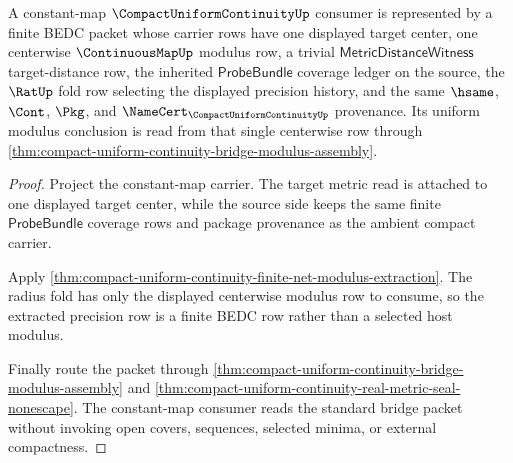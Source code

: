 \begin{theorem}
\label{thm:compact-uniform-continuity-constant-map-example}
A constant-map $\CompactUniformContinuityUp$ consumer is represented by a finite BEDC packet whose carrier rows have one displayed target center, one centerwise $\ContinuousMapUp$ modulus row, a trivial $\mathsf{MetricDistanceWitness}$ target-distance row, the inherited $\mathsf{ProbeBundle}$ coverage ledger on the source, the $\RatUp$ fold row selecting the displayed precision history, and the same $\hsame$, $\Cont$, $\Pkg$, and $\NameCert_{\CompactUniformContinuityUp}$ provenance. Its uniform modulus conclusion is read from that single centerwise row through \autoref{thm:compact-uniform-continuity-bridge-modulus-assembly}.
\end{theorem}
\begin{proof}
Project the constant-map carrier. The target metric read is attached to one displayed target center, while the source side keeps the same finite $\mathsf{ProbeBundle}$ coverage rows and package provenance as the ambient compact carrier.

Apply \autoref{thm:compact-uniform-continuity-finite-net-modulus-extraction}. The radius fold has only the displayed centerwise modulus row to consume, so the extracted precision row is a finite BEDC row rather than a selected host modulus.

Finally route the packet through \autoref{thm:compact-uniform-continuity-bridge-modulus-assembly} and \autoref{thm:compact-uniform-continuity-real-metric-seal-nonescape}. The constant-map consumer reads the standard bridge packet without invoking open covers, sequences, selected minima, or external compactness.
\end{proof}

